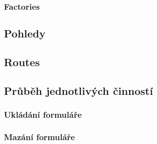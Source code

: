 		\subsubsection{Factories}
	
	\subsection{Pohledy}
	
	\subsection{Routes}
	
	\subsection{Průběh jednotlivých činností}
		\subsubsection{Ukládání formuláře}
		\subsubsection{Mazání formuláře}


